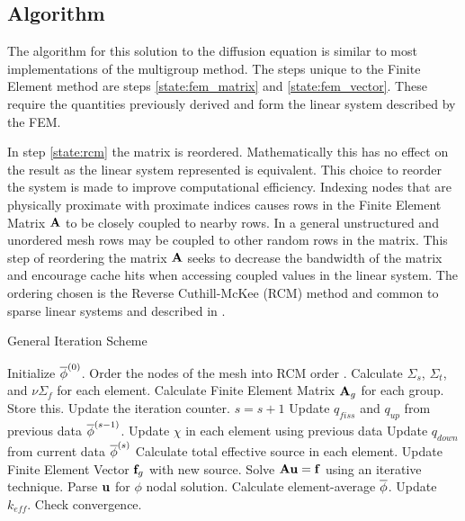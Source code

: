   \subsection{Algorithm}
    The algorithm for this solution to the diffusion equation is similar to most
    implementations of the multigroup method. The steps unique to the Finite
    Element method are steps \ref{state:fem_matrix} and \ref{state:fem_vector}.
    These require the quantities previously derived and form the linear system 
    described by the FEM. 
    
    In step \ref{state:rcm} the matrix is reordered. Mathematically this has no
    effect on the result as the linear system represented is equivalent. This 
    choice to reorder the system is made to improve computational efficiency. 
    Indexing nodes that are physically proximate with proximate indices causes 
    rows in the Finite Element Matrix $\mathbf{A}$ to be closely coupled to nearby
    rows. In a general unstructured and unordered mesh rows may be coupled to 
    other random rows in the matrix. This step of reordering the matrix $\mathbf{A}$ 
    seeks to decrease the bandwidth of the matrix and encourage cache hits when
    accessing coupled values in the linear system. The ordering chosen is the
    Reverse Cuthill-McKee (RCM) method and common to sparse linear systems and 
    described in \cite{rcm}.
    
    \begin{algorithm}
      \caption{General Iteration Scheme}
      \begin{algorithmic}[1]
      \State Initialize $\overline{\phi}^{(0)}$.
      \State Order the nodes of the mesh into RCM order \cite{rcm}.
        \label{state:rcm}
      \State Calculate $\Sigma_s$, $\Sigma_t$, and $\nu \Sigma_f$ for each 
        element.
      \State Calculate Finite Element Matrix $\mathbf{A}_g$ for each group. Store this. 
        \label{state:fem_matrix}
      	\State Update the iteration counter. $s=s+1$
      	\State Update $q_{fiss}$ and $q_{up}$ from previous data
          $\overline{\phi}^{(s-1)}$.
        \State Update $\chi$ in each element using previous data
          \State Update $q_{down}$ from current data $\overline{\phi}^{(s)}$
          \State Calculate total effective source in each element.
          \State Update Finite Element Vector $\mathbf{f}_g$ with new source.
            \label{state:fem_vector}
          \State Solve $\mathbf{A} \mathbf{u} = \mathbf{f}$ using an iterative technique.
          \State Parse $\mathbf{u}$ for $\phi$ nodal solution.
          \State Calculate element-average $\overline{\phi}$.
        \EndFor
        \State Update $k_{eff}$.
        \State Check convergence.
      \EndWhile
      \end{algorithmic}
    \end{algorithm}
    
